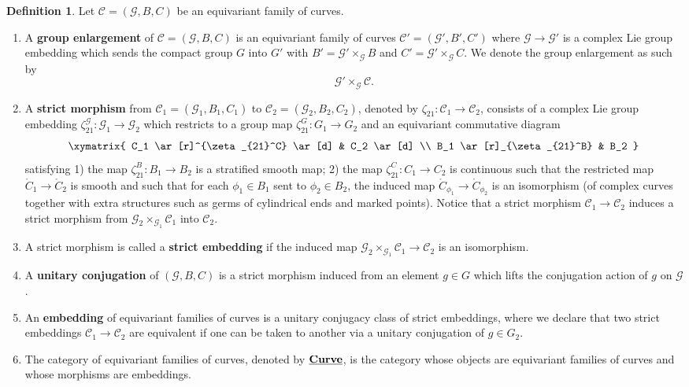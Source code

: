 \documentclass[reqno, 10pt]{amsart}
\numberwithin{equation}{section}
\numberwithin{equation}{section}
\theoremstyle{definition}
\newtheorem{defn}[thm]{Definition}
\theoremstyle{remark}
\newcommand{\beqn}{\begin{equation*}}
\newcommand{\eeqn}{\end{equation*}}
\newcommand{\mc}{\mathcal}
\newcommand{\uds}[1]{\underline{\smash{#1}}}
\begin{document}
\begin{defn}\label{defn_curve_2} Let ${\mc C} = ({\mc G}, B, C)$ be an equivariant family of curves.
\begin{enumerate}

\item A {\bf group enlargement} of ${\mc C} = ({\mc G}, B, C)$ is an equivariant family of curves ${\mc C}' = ({\mc G}', B', C')$ where ${\mc G} \to {\mc G}'$ is a complex Lie group embedding which sends the compact group $G$ into $G'$ with $B' = {\mc G}' \times_{\mc G} B$ and $C' = {\mc G}' \times_{\mc G} C$. We denote the group enlargement as such by 
\beqn
{\mc G}'\times_{\mc G} {\mc C}.
\eeqn

\item A {\bf strict morphism} from ${\mc C}_1 = ({\mc G}_1, B_1, C_1)$ to ${\mc C}_2 = ({\mc G}_2, B_2, C_2)$, denoted by $\zeta_{21}: {\mc C}_1 \to {\mc C}_2$, consists of a complex Lie group embedding $\zeta_{21}^{{\mc G}}: {\mc G}_1 \to {\mc G}_2$ which restricts to a group map $\zeta_{21}^G: G_1 \to G_2$ and an equivariant commutative diagram
\beqn
\xymatrix{ C_1 \ar[r]^{\zeta_{21}^C}  \ar[d] & C_2 \ar[d] \\
 B_1 \ar[r]_{\zeta_{21}^B} & B_2 }
\eeqn
satisfying 1) the map $\zeta_{21}^B: B_1 \to B_2$ is a stratified smooth map; 2) the map $\zeta_{21}^C: C_1 \to C_2$ is continuous such that the restricted map $\mathring C_1 \to \mathring C_2$ is smooth and such that for each $\phi_1 \in B_1$ sent to $\phi_2 \in B_2$, the induced map $\mathring C_{\phi_1} \to \mathring C_{\phi_2}$ is an isomorphism (of complex curves together with extra structures such as germs of cylindrical ends and marked points). Notice that a strict morphism ${\mc C}_1 \to {\mc C}_2$ induces a strict morphism from ${\mc G}_2 \times_{{\mc G}_1} {\mc C}_1$ into ${\mc C}_2$. 

\item A strict morphism is called a {\bf strict embedding} if the induced map ${\mc G}_2\times_{{\mc G}_1} {\mc C}_1 \to {\mc C}_2$ is an isomorphism.


\item A {\bf unitary conjugation} of $({\mc G}, B, C)$ is a strict morphism induced from an element $g \in G$ which lifts the conjugation action of $g$ on ${\mc G}$.

\item An {\bf embedding} of equivariant families of curves is a unitary conjugacy class of strict embeddings, where we declare that two strict embeddings ${\mc C}_1 \to {\mc C}_2$ are equivalent if one can be taken to another via a unitary conjugation of $g \in G_2$.

\item The category of equivariant families of curves, denoted by $\uds{\bf Curve}$, is the category whose objects are equivariant families of curves and whose morphisms are embeddings.

\end{enumerate}
\end{defn}
\end{document}

